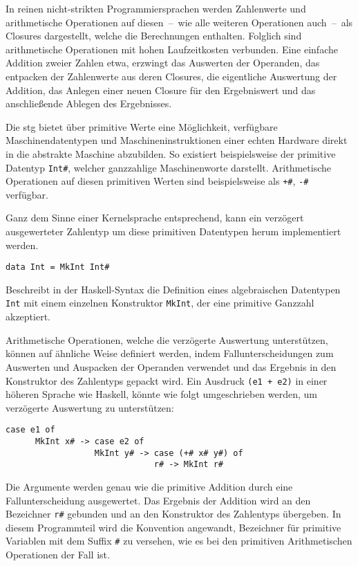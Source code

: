 In reinen nicht-strikten Programmiersprachen werden Zahlenwerte und arithmetische Operationen auf diesen~--~wie alle weiteren Operationen auch~--~als Closures dargestellt, welche die Berechnungen enthalten.
Folglich sind arithmetische Operationen mit hohen Laufzeitkosten verbunden.
Eine einfache Addition zweier Zahlen etwa, erzwingt das Auswerten der Operanden, das entpacken der Zahlenwerte aus deren Closures, die eigentliche Auswertung der Addition, das Anlegen einer neuen Closure für den Ergebniswert und das anschließende Ablegen des Ergebnisses.

Die \gls{stg} bietet über primitive Werte eine Möglichkeit, verfügbare Maschinendatentypen und Maschineninstruktionen einer echten Hardware direkt in die abstrakte Maschine abzubilden.
So existiert beispielsweise der primitive Datentyp \texttt{Int\#}, welcher ganzzahlige Maschinenworte darstellt.
Arithmetische Operationen auf diesen primitiven Werten sind beispielsweise als \texttt{+\#}, \texttt{-\#} verfügbar.

Ganz dem Sinne einer Kernelsprache entsprechend, kann ein verzögert ausgewerteter Zahlentyp um diese primitiven Datentypen herum implementiert werden.

\begin{center}
  \texttt{data Int = MkInt Int\#}
\end{center}

Beschreibt in der Haskell-Syntax die Definition eines algebraischen Datentypen \texttt{Int} mit einem einzelnen Konstruktor \texttt{MkInt}, der eine primitive Ganzzahl akzeptiert.

Arithmetische Operationen, welche die verzögerte Auswertung unterstützen, können auf ähnliche Weise definiert werden, indem Fallunterscheidungen zum Auswerten und Auspacken der Operanden verwendet und das Ergebnis in den Konstruktor des Zahlentyps gepackt wird.
Ein Ausdruck \texttt{(e1 + e2)} in einer höheren Sprache wie Haskell, könnte wie folgt umgeschrieben werden, um verzögerte Auswertung zu unterstützen:

\begin{lstlisting}[frame=none,backgroundcolor=\color{white}]
      case e1 of
      MkInt x# -> case e2 of
                  MkInt y# -> case (+# x# y#) of
                              r# -> MkInt r#
\end{lstlisting}

Die Argumente werden genau wie die primitive Addition durch eine Fallunterscheidung ausgewertet.
Das Ergebnis der Addition wird an den Bezeichner \texttt{r\#} gebunden und an den Konstruktor des Zahlentyps übergeben.
In diesem Programmteil wird die Konvention angewandt, Bezeichner für primitive Variablen mit dem Suffix \texttt{\#} zu versehen, wie es bei den primitiven Arithmetischen Operationen der Fall ist.

